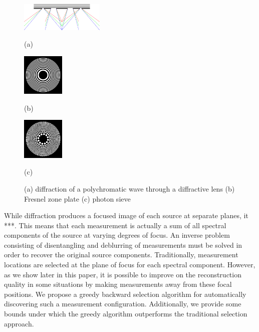 \documentclass{article}
\begin{document}
\begin{figure}[htb]

\begin{minipage}[b]{0.48\linewidth}
  \centering
  \centerline{\includegraphics[width=4.0cm]{diffraction_ps_rgb}}
  \centerline{(a)}\medskip
\end{minipage}
\hfill
\begin{minipage}[b]{0.24\linewidth}
  \centering
  \centerline{\includegraphics[width=2.0cm]{zoneplate}}
  \centerline{(b)}\medskip
\end{minipage}
\hfill
\begin{minipage}[b]{0.24\linewidth}
  \centering
  \centerline{\includegraphics[width=2.0cm]{photonsieve}}
  \centerline{(c)}\medskip
\end{minipage}
\caption{(a) diffraction of a polychromatic wave through a diffractive lens (b) Fresnel zone
plate (c) photon sieve}
\label{fig:diff_lens}
%
\end{figure}

While diffraction produces a focused image of each source at separate planes, it
***.  This means that each measurement is actually a sum of all spectral
components of the source at varying degrees of focus.  An inverse problem
consisting of disentangling and deblurring of measurements must be solved in
order to recover the original source components.  Traditionally, measurement
locations are selected at the plane of focus for each spectral component.
However, as we show later in this paper, it is possible to improve on the
reconstruction quality in some situations by making measurements away from these
focal positions. We propose a greedy backward selection algorithm for
automatically discovering such a measurement configuration. Additionally, we
provide some bounds under which the greedy algorithm outperforms the traditional
selection approach.
\end{document}
